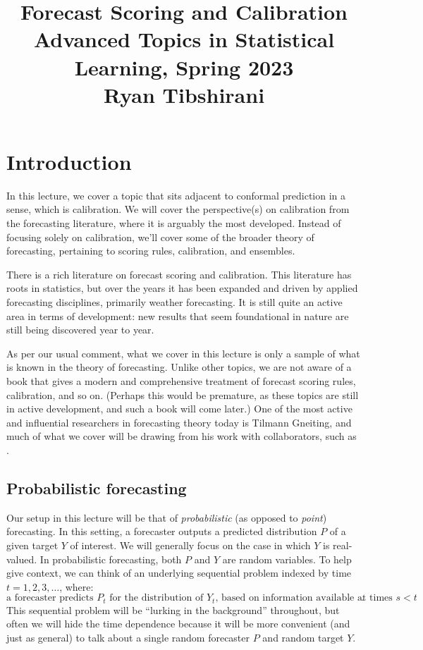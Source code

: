 \documentclass{article}
\title{Forecast Scoring and Calibration \\ \smallskip
\large Advanced Topics in Statistical Learning, Spring 2023 \\ \smallskip
Ryan Tibshirani }
\date{}
\begin{document}
\maketitle
\RaggedRight
\vspace{-50pt}

\section{Introduction}

In this lecture, we cover a topic that sits adjacent to conformal prediction in
a sense, which is calibration. We will cover the perspective(s) on calibration 
from the forecasting literature, where it is arguably the most developed. 
Instead of focusing solely on calibration, we'll cover some of the broader
theory of forecasting, pertaining to scoring rules, calibration, and ensembles.     

There is a rich literature on forecast scoring and calibration. This literature
has roots in statistics, but over the years it has been expanded and driven by
applied forecasting disciplines, primarily weather forecasting. It is still
quite an active area in terms of development: new results that seem foundational
in nature are still being discovered year to year.  

As per our usual comment, what we cover in this lecture is only a sample of what
is known in the theory of forecasting. Unlike other topics, we are not aware of
a book that gives a modern and comprehensive treatment of forecast scoring
rules, calibration, and so on. (Perhaps this would be premature, as these topics
are still in active development, and such a book will come later.) One of the
most active and influential researchers in forecasting theory today is Tilmann
Gneiting, and much of what we cover will be drawing from his work with
collaborators, such as \citet{gneiting2007strictly, gneiting2007probabilistic,
    ranjan2010combining, gneiting2013combining}.

\subsection{Probabilistic forecasting}

Our setup in this lecture will be that of \emph{probabilistic} (as opposed to
\emph{point}) forecasting. In this setting, a forecaster outputs a predicted
distribution $P$ of a given target $Y$ of interest. We will generally focus on
the case in which $Y$ is real-valued. In probabilistic forecasting, both $P$ and
$Y$ are random variables. To help give context, we can think of an underlying
sequential problem indexed by time $t=1,2,3,\dots$, where:
\[
\text{a forecaster predicts $P_t$ for the distribution of $Y_t$, based on
  information available at times $s<t$}.
\]
This sequential problem will be ``lurking in the background'' throughout, but
often we will hide the time dependence because it will be more convenient (and
just as general) to talk about a single random forecaster $P$ and random target
$Y$. 
\end{document}

